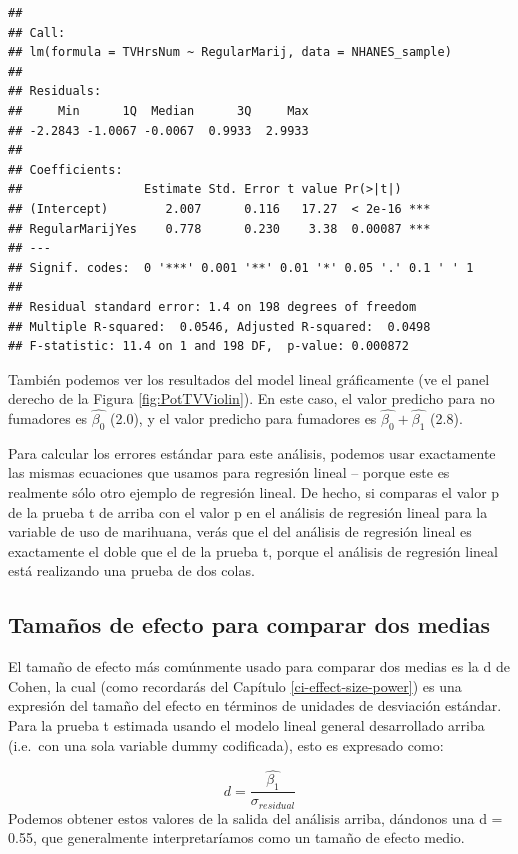 \documentclass[
  12pt,
]{book}
\begin{document}
\begin{verbatim}
## 
## Call:
## lm(formula = TVHrsNum ~ RegularMarij, data = NHANES_sample)
## 
## Residuals:
##     Min      1Q  Median      3Q     Max 
## -2.2843 -1.0067 -0.0067  0.9933  2.9933 
## 
## Coefficients:
##                 Estimate Std. Error t value Pr(>|t|)    
## (Intercept)        2.007      0.116   17.27  < 2e-16 ***
## RegularMarijYes    0.778      0.230    3.38  0.00087 ***
## ---
## Signif. codes:  0 '***' 0.001 '**' 0.01 '*' 0.05 '.' 0.1 ' ' 1
## 
## Residual standard error: 1.4 on 198 degrees of freedom
## Multiple R-squared:  0.0546, Adjusted R-squared:  0.0498 
## F-statistic: 11.4 on 1 and 198 DF,  p-value: 0.000872
\end{verbatim}

También podemos ver los resultados del model lineal gráficamente (ve el panel derecho de la Figura \ref{fig:PotTVViolin}). En este caso, el valor predicho para no fumadores es \(\hat{\beta_0}\) (2.0), y el valor predicho para fumadores es \(\hat{\beta_0} +\hat{\beta_1}\) (2.8).

Para calcular los errores estándar para este análisis, podemos usar exactamente las mismas ecuaciones que usamos para regresión lineal -- porque este es realmente sólo otro ejemplo de regresión lineal. De hecho, si comparas el valor p de la prueba t de arriba con el valor p en el análisis de regresión lineal para la variable de uso de marihuana, verás que el del análisis de regresión lineal es exactamente el doble que el de la prueba t, porque el análisis de regresión lineal está realizando una prueba de dos colas.

\hypertarget{tamauxf1os-de-efecto-para-comparar-dos-medias}{%
\subsection{Tamaños de efecto para comparar dos medias}\label{tamauxf1os-de-efecto-para-comparar-dos-medias}}

El tamaño de efecto más comúnmente usado para comparar dos medias es la d de Cohen, la cual (como recordarás del Capítulo \ref{ci-effect-size-power}) es una expresión del tamaño del efecto en términos de unidades de desviación estándar. Para la prueba t estimada usando el modelo lineal general desarrollado arriba (i.e.~con una sola variable dummy codificada), esto es expresado como:

\[
d = \frac{\hat{\beta_1}}{\sigma_{residual}}
\]
Podemos obtener estos valores de la salida del análisis arriba, dándonos una d = 0.55, que generalmente interpretaríamos como un tamaño de efecto medio.
\end{document}
